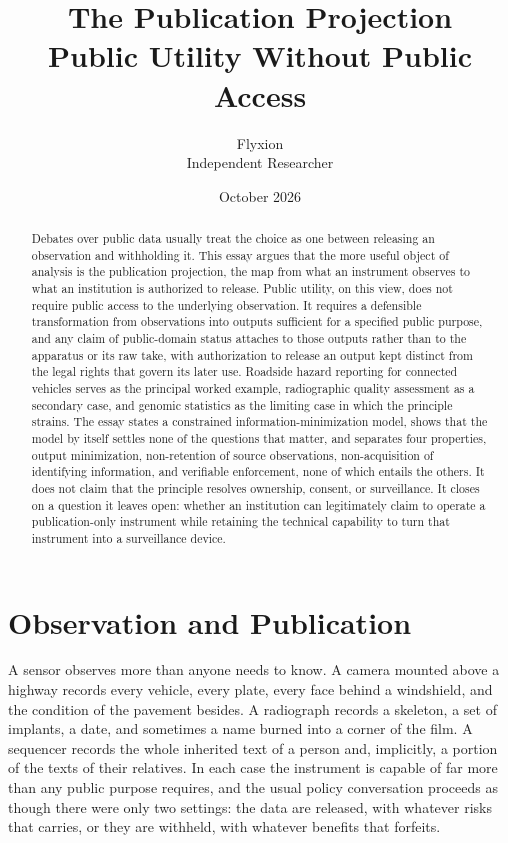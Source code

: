 \documentclass[11pt]{article}
\title{The Publication Projection\\[0.4em]
\large Public Utility Without Public Access}
\author{Flyxion\\Independent Researcher}
\date{October 2026}
\theoremstyle{definition}
\begin{document}
\maketitle

\begin{abstract}
\noindent
Debates over public data usually treat the choice as one between releasing an observation and withholding it. This essay argues that the more useful object of analysis is the publication projection, the map from what an instrument observes to what an institution is authorized to release. Public utility, on this view, does not require public access to the underlying observation. It requires a defensible transformation from observations into outputs sufficient for a specified public purpose, and any claim of public-domain status attaches to those outputs rather than to the apparatus or its raw take, with authorization to release an output kept distinct from the legal rights that govern its later use. Roadside hazard reporting for connected vehicles serves as the principal worked example, radiographic quality assessment as a secondary case, and genomic statistics as the limiting case in which the principle strains. The essay states a constrained information-minimization model, shows that the model by itself settles none of the questions that matter, and separates four properties, output minimization, non-retention of source observations, non-acquisition of identifying information, and verifiable enforcement, none of which entails the others. It does not claim that the principle resolves ownership, consent, or surveillance. It closes on a question it leaves open: whether an institution can legitimately claim to operate a publication-only instrument while retaining the technical capability to turn that instrument into a surveillance device.
\end{abstract}

\section{Observation and Publication}

A sensor observes more than anyone needs to know. A camera mounted above a highway records every vehicle, every plate, every face behind a windshield, and the condition of the pavement besides. A radiograph records a skeleton, a set of implants, a date, and sometimes a name burned into a corner of the film. A sequencer records the whole inherited text of a person and, implicitly, a portion of the texts of their relatives. In each case the instrument is capable of far more than any public purpose requires, and the usual policy conversation proceeds as though there were only two settings: the data are released, with whatever risks that carries, or they are withheld, with whatever benefits that forfeits.
\end{document}
